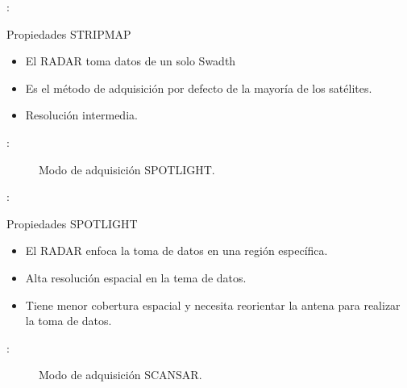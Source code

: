 \begin{frame}{\secname : \subsecname}
    \begin{block}{Propiedades STRIPMAP}
      \begin{itemize}
        \item El RADAR toma datos de un solo Swadth
        \item Es el método de adquisición por defecto de la mayoría de los satélites.
        \item Resolución intermedia.
      \end{itemize}
    \end{block}
\end{frame}
\begin{frame}{\secname : \subsecname}
  \begin{figure}
    \centering
    \caption{Modo de adquisición SPOTLIGHT.}
    \label{}
  \end{figure}
\end{frame}

\begin{frame}{\secname : \subsecname}
    \begin{block}{Propiedades SPOTLIGHT}
      \begin{itemize}
        \item El RADAR enfoca la toma de datos en una región específica.
        \item Alta resolución espacial en la tema de datos.
        \item Tiene menor cobertura espacial y necesita reorientar la antena para realizar la toma de datos.
      \end{itemize}
    \end{block}
\end{frame}

\begin{frame}{\secname : \subsecname}
  \begin{figure}
    \centering
    \caption{Modo de adquisición SCANSAR.}
    \label{}
  \end{figure}
\end{frame}

